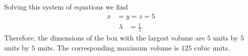 Solving this system of equations we find
\begin{align*}
    x &= y = z = 5
\end{align*}
\begin{align*}
    \lambda &= \frac{1}{5}.
\end{align*}
Therefore, the dimensions of the box with the largest volume are $5$ units by $5$ units by $5$ units.
The corresponding maximum volume is $125$ cubic units.



